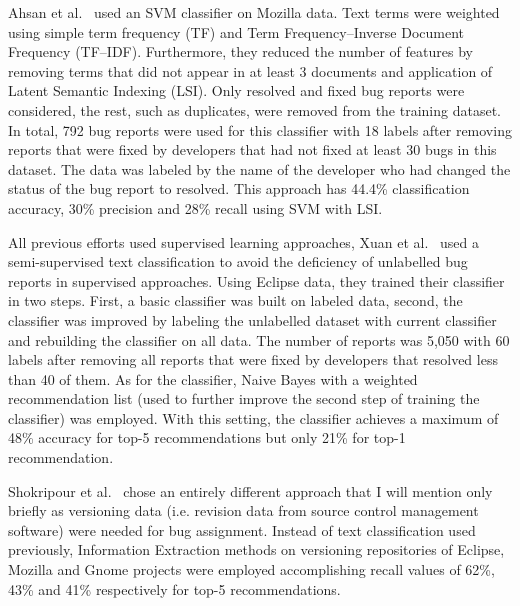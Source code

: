 Ahsan et al.~\cite{Ahsan2009} used an SVM classifier on Mozilla data. Text terms were weighted using simple term frequency (TF) and Term Frequency--Inverse Document Frequency (TF--IDF). Furthermore, they reduced the number of features by removing terms that did not appear in at least 3 documents and application of Latent Semantic Indexing (LSI). Only resolved and fixed bug reports were considered, the rest, such as duplicates, were removed from the training dataset. In total, 792 bug reports were used for this classifier with 18 labels after removing reports that were fixed by developers that had not fixed at least 30 bugs in this dataset. The data was labeled by the name of the developer who had changed the status of the bug report to resolved. This approach has 44.4\% classification accuracy, 30\% precision and 28\% recall using SVM with LSI.

All previous efforts used supervised learning approaches, Xuan et al.~\cite{Xuan2010} used a semi-supervised text classification to avoid the deficiency of unlabelled bug reports in supervised approaches. Using Eclipse data, they trained their classifier in two steps. First, a basic classifier was built on labeled data, second, the classifier was improved by labeling the unlabelled dataset with current classifier and rebuilding the classifier on all data. The number of reports was 5,050 with 60 labels after removing all reports that were fixed by developers that resolved less than 40 of them. As for the classifier, Naive Bayes with a weighted recommendation list (used to further improve the second step of training the classifier) was employed. With this setting, the classifier achieves a maximum of 48\% accuracy for top-5 recommendations but only 21\% for top-1 recommendation.

Shokripour et al.~\cite{Shokripour2011} chose an entirely different approach that I will mention only briefly as versioning data (i.e. revision data from source control management software) were needed for bug assignment. Instead of text classification used previously, Information Extraction methods on versioning repositories of Eclipse, Mozilla and Gnome projects were employed accomplishing recall values of 62\%, 43\% and 41\% respectively for top-5 recommendations.

